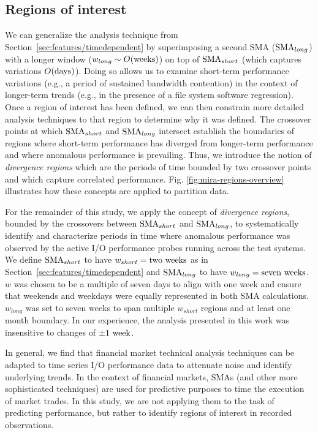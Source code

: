 \subsection{Regions of interest} \label{sec:features/partitioning}

We can generalize the analysis technique from
Section~\ref{sec:features/timedependent} 
by superimposing a second SMA ($\textup{SMA}_{long}$) with a longer window (${w_{long} \sim O(\textup{weeks})}$) on top of $\textup{SMA}_{short}$ (which captures variations ${O(\textup{days})}$).
Doing so allows us to examine short-term performance variations (e.g., a
period of sustained bandwidth contention) in the context of longer-term
trends (e.g., in the presence of a file system software regression).
Once a region of interest has been defined, we can then constrain more detailed
analysis techniques to that region to determine why it was defined.
The crossover points at which $\textup{SMA}_{short}$ and  $\textup{SMA}_{long}$ intersect establish the boundaries of regions where short-term performance has diverged from longer-term performance and where anomalous performance is prevailing.
Thus, we introduce the notion of \emph{divergence regions} which are the periods of time bounded by two crossover points and which capture correlated performance.
Fig. \ref{fig:mira-regions-overview} illustrates how these concepts are applied to partition data.

For the remainder of this study, we apply the concept of \emph{divergence regions}, bounded by the crossovers between $\textup{SMA}_{short}$ and $\textup{SMA}_{long}$, to systematically identify and characterize periods in time where anomalous performance was observed by the active I/O performance probes running across the test systems.
We define $\textup{SMA}_{short}$ to have ${w_{short} = \textup{two weeks}}$ as in Section~\ref{sec:features/timedependent} and $\textup{SMA}_{long}$ to have ${w_{long} = \textup{seven weeks}}$.
$w$ was chosen to be a multiple of seven days to align with one
week and ensure that weekends and weekdays were equally represented in both SMA
calculations. $w_{long}$ was set to seven weeks to span multiple $w_{short}$
regions and at least one month boundary.  In our experience, the analysis
presented in this work was insensitive to changes of $\pm 1 \textup{ week}$.

In general, we find that financial market technical
analysis techniques can be adapted to
time series I/O performance data to attenuate noise and identify underlying trends.
In the context of financial markets, SMAs (and other more
sophisticated techniques) are used for predictive purposes to time
the execution of market trades.  In this study, we are not applying them to
the task of predicting performance, but rather to identify regions of
interest in recorded observations.

